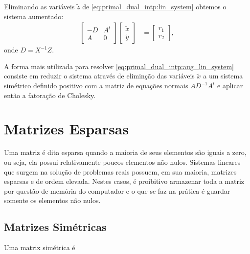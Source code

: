 Eliminando as variáveis $\tilde{z}$ de \eqref{eq:primal_dual_intp:lin_system}
obtemos o sistema aumentado:
\begin{align}
    \begin{bmatrix}
        -D & A^t \\
        A & 0
    \end{bmatrix} \begin{bmatrix}
        \tilde{x} \\
        \tilde{y}
    \end{bmatrix} &= \begin{bmatrix}
        r_1 \\
        r_2
    \end{bmatrix},
    \label{eq:primal_dual_intp:aug_lin_system}
\end{align}
onde $D = X^{-1} Z$.

A forma mais utilizada para resolver \eqref{eq:primal_dual_intp:aug_lin_system}
consiste em reduzir o sistema através de eliminção das variáveis $\tilde{x}$ a
um sistema simétrico definido positivo com a matriz de equações normais $A
D^{-1} A^t$ e aplicar então a fatoração de Cholesky.

\section{Matrizes Esparsas}
Uma matriz é dita esparsa quando a maioria de seus elementos são iguais a zero, ou seja, ela possui relativamente poucos elementos não nulos. Sistemas lineares que surgem na solução de problemas reais possuem, em sua maioria, matrizes esparsas e de ordem elevada. Nestes casos, é proibitivo armazenar toda a matriz por questão de memória do computador e o que se faz na prática é guardar somente os elementos não nulos.

\subsection{Matrizes Simétricas}
Uma matrix simétrica é

